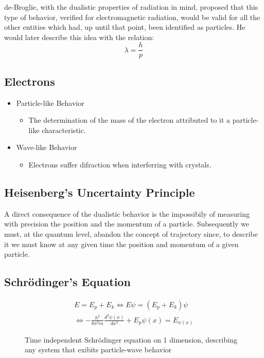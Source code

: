 \documentclass{article}[10pt]
\begin{document}
de-Broglie, with the dualistic properties of radiation in mind,
proposed that this type of behavior, verified for electromagnetic radiation,
would be valid for all the other entities which had, up until that point, been
identified as particles. He would later describe this idea with the
relation:
$$\lambda = \frac{h}{p}$$

\subsection{Electrons}
\begin{itemize}
	\item Particle-like Behavior
	      \begin{itemize}
	      	\item The determination of the mass of the electron attributed to
	      	      it a particle-like characteristic.
	      \end{itemize}
	\item Wave-like Behavior
	      \begin{itemize}
	      	\item Electrons suffer difraction when interferring with crystals.
	      \end{itemize}
\end{itemize}

\subsection{Heisenberg's Uncertainty Principle}
A direct consequence of the dualistic behavior is the impossibily of measuring
with precision the position and the momentum of a particle. Subsequently we
must, at the quantum level, abandon the concept of trajectory since, to describe
it we must know at any given time the position and momentum of a given particle.

\subsection{Schrödinger's Equation}
\begin{figure}[H]
	\centering
	\begin{align*}
		E = E_p + E_k \iff E\psi = (E_p + E_k)\psi                                   \\
		\iff -\frac{h^2}{8\pi^2 m}\frac{d^2\psi(x)}{dx^2} + E_p\psi(x) = E_{\psi(x)}
	\end{align*}
	\caption*{Time independent Schrödinger equation on 1 dimension, describing any system that exibits particle-wave behavior}
\end{figure}
\end{document}
